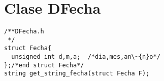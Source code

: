 \documentclass{article}
\begin{document}
%    
%    
\section*{Clase DFecha}
\begin{center}
\end{center}
\begin{verbatim}
/**DFecha.h
 */
struct Fecha{
  unsigned int d,m,a;  /*dia,mes,an\~{n}o*/
};/*end struct Fecha*/
string get_string_fecha(struct Fecha F);
\end{verbatim}
\end{document}
